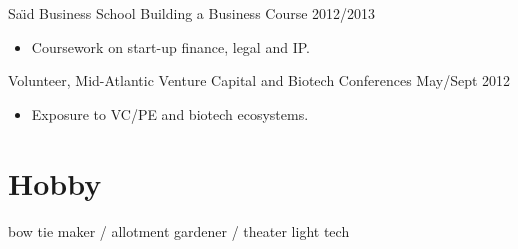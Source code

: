 \documentclass[margin]{res}
\newcommand{\nbdatesubsection}[2]{#1 \hfill #2 }
\begin{document}
\begin{sloppypar}
\begin{resume}
\nbdatesubsection{Sa\"\i d Business School Building a Business Course}{2012/2013}
    \begin{itemize}
            \item Coursework on start-up finance, legal and IP.
    \end{itemize}

\nbdatesubsection{Volunteer, Mid-Atlantic Venture Capital and Biotech Conferences}{May/Sept 2012}
    \begin{itemize}
            \item Exposure to VC/PE and biotech ecosystems.
    \end{itemize}




\section{Hobby}
bow tie maker / allotment gardener / theater light tech



\end{resume}
\end{sloppypar}
\end{document}
